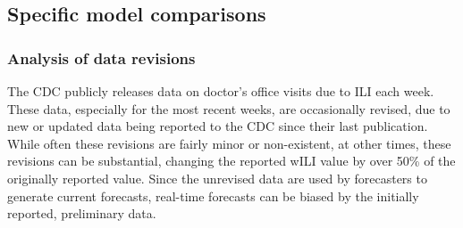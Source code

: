 \documentclass{article}\usepackage[]{graphicx}\usepackage[]{color}
\begin{document}
% 


\subsection*{Specific model comparisons}\label{sec:delay-model}

\subsubsection*{Analysis of data revisions}

The CDC publicly releases data on doctor's office visits due to ILI each week. 
These data, especially for the most recent weeks, are occasionally revised, due to new or updated data being reported to the CDC since their last publication.
While often these revisions are fairly minor or non-existent, at other times, these revisions can be substantial, changing the reported wILI value by over 50\% of the originally reported value.
Since the unrevised data are used by forecasters to generate current forecasts, real-time forecasts can be biased by the initially reported, preliminary data.
\end{document}

